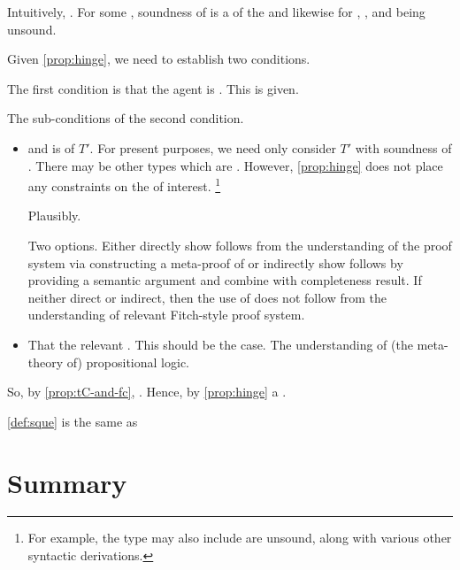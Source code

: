 \begin{note}
  Intuitively, \tCV{}.
  For some \tRep{}, soundness of \sqE{} is a \tI{} of the \tRep{} and likewise for \sqaE{}, \sqoE{}, and \sqeE{} being unsound.

  Given \autoref{prop:hinge}, we need to establish two conditions.

  The first condition is that the agent is \tC{} .
  This is given.

  The sub-conditions of the second condition.

  \begin{itemize}
  \item
    \tRep{} and \sqE{} is \tI{} of \(T'\).
    For present purposes, we need only consider \(T'\) with soundness of \sqE{}.
    There may be other types which are .
    However, \autoref{prop:hinge} does not place any constraints on the \tRep{} of interest.%
    \footnote{
      For example, the type may also include  are unsound, along with various other syntactic derivations.
    }

    Plausibly.

      Two options.
  Either directly show \sqE{} follows from the \agents{} understanding of the proof system via constructing a meta-proof of \sqE{} or indirectly show \sqE{} follows by providing a semantic argument and combine with completeness result.
  If neither direct or indirect, then the \agents{} use of \sqE{} does not follow from the \agents{} understanding of relevant Fitch-style proof system.
  \item
    That the relevant \pool{}.
    This should be the case.
    The \agents{} understanding of (the meta-theory of) propositional logic.
  \end{itemize}
\end{note}



\begin{note}
  So, by \autoref{prop:tC-and-fc}, \fc{}.
  Hence, by \autoref{prop:hinge} a \requ{}.
  
\end{note}



\begin{note}
  \autoref{def:sque} is the same as 
\end{note}



\section*{Summary}


